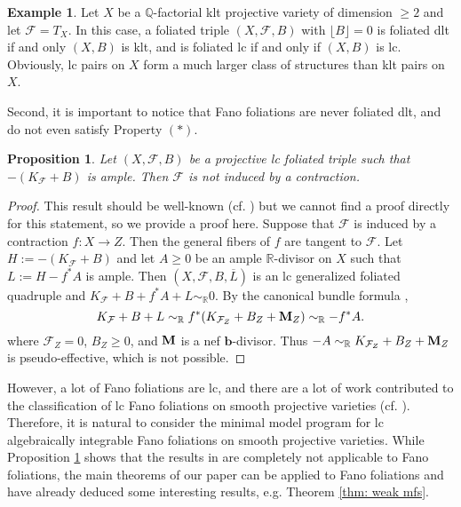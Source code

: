\documentclass[11pt]{amsart}
\numberwithin{equation}{section}
\newcommand{\bb}{\bm{b}}
\newcommand{\Mm}{{\bf{M}}}
\newcommand{\Qq}{\mathbb{Q}}
\newcommand{\Rr}{\mathbb{R}}
\newcommand{\Ff}{\mathcal{F}}
\newtheorem{prop}[thm]{Proposition}
\theoremstyle{definition}
\theoremstyle{definition}
\newtheorem{ex}[thm]{Example}
\theoremstyle{definition}
\begin{document}
\begin{ex}
Let $X$ be a $\Qq$-factorial klt projective variety of dimension $\geq 2$ and let $\Ff=T_X$. In this case, a foliated triple $(X,\Ff,B)$ with $\lfloor B\rfloor=0$ is foliated dlt if and only $(X,B)$ is klt, and is foliated lc if and only if $(X,B)$ is lc. Obviously, lc pairs on $X$ form a much larger class of structures than klt pairs on $X$.
\end{ex}

Second, it is important to notice that Fano foliations are never foliated dlt, and do not even satisfy Property $(*)$. 

\begin{prop}\label{prop: lc fano not induced by contraction}
    Let $(X,\Ff,B)$ be a projective lc foliated triple such that $-(K_{\Ff}+B)$ is ample. Then $\Ff$ is not induced by a contraction. 
\end{prop}
\begin{proof}
This result should be well-known (cf. \cite[Theorem 5.1]{AD13}) but we cannot find a proof directly for this statement, so we provide a proof here. Suppose that $\Ff$ is induced by a contraction $f: X\rightarrow Z$. Then the general fibers of $f$ are tangent to $\Ff$. Let $H:=-(K_{\Ff}+B)$ and let $A\geq 0$ be an ample $\Rr$-divisor on $X$ such that $L:=H-f^*A$ is ample. Then $(X,\Ff,B,\overline{L})$ is an lc generalized foliated quadruple and $K_{\Ff}+B+f^*A+L\sim_{\mathbb R}0$. By the canonical bundle formula \cite[Theorem 2.3.2]{CHLX23}, 
    $$K_{\Ff}+B+L\sim_{\mathbb R}f^*(K_{\Ff_Z}+B_Z+\Mm_Z)\sim_{\mathbb R}-f^*A.$$
    where $\Ff_Z=0$, $B_Z\geq 0$, and $\Mm$ is a nef $\bb$-divisor. Thus $-A\sim_{\mathbb R}K_{\Ff_Z}+B_Z+\Mm_Z$ is pseudo-effective, which is not possible.
\end{proof}
However, a lot of Fano foliations are lc, and there are a lot of work contributed to the classification of lc Fano foliations on smooth projective varieties (cf. \cite{AD13,AD16}). Therefore, it is natural to consider the minimal model program for lc algebraically integrable Fano foliations on smooth projective varieties. While Proposition \ref{prop: lc fano not induced by contraction} shows that the results in \cite{CHLX23} are completely not applicable to Fano foliations, the main theorems of our paper can be applied to Fano foliations and have already deduced some interesting results, e.g. Theorem \ref{thm: weak mfs}.
\end{document}
